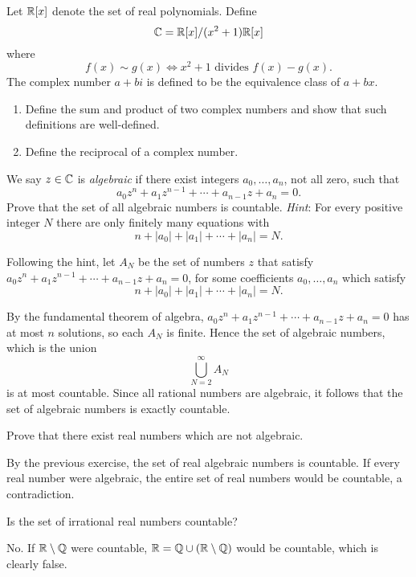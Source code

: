 \begin{exercise}
Let $\mathbb R[x]$ denote the set of real polynomials. Define
\[\mathbb C=\mathbb R[x]/(x^2+1)\mathbb R[x]\]
where
\[f(x)\sim g(x)\iff x^2+1\text{ divides }f(x)-g(x).\]
The complex number $a+bi$ is defined to be the equivalence class of $a+bx$.
\begin{enumerate}[label=(\alph*)]
\item Define the sum and product of two complex numbers and show that such definitions are well-defined.
\item Define the reciprocal of a complex number.
\end{enumerate}
\end{exercise}

\begin{exercise}
We say $z\in\mathbb C$ is \emph{algebraic} if there exist integers $a_0,\dots,a_n$, not all zero, such that
\[a_0z^n+a_1z^{n-1}+\cdots+a_{n-1}z+a_n=0.\]
Prove that the set of all algebraic numbers is countable. \emph{Hint}: For every positive integer $N$ there are only finitely many equations with
\[n+|a_0|+|a_1|+\cdots+|a_n|=N.\]
\end{exercise}

\begin{solution}
Following the hint, let $A_N$ be the set of numbers $z$ that satisfy $a_0z^n+a_1z^{n-1}+\cdots+a_{n-1}z+a_n=0$, for some coefficients $a_0,\dots,a_n$ which satisfy
\[n+|a_0|+|a_1|+\cdots+|a_n|=N.\]

By the fundamental theorem of algebra, $a_0z^n+a_1z^{n-1}+\cdots+a_{n-1}z+a_n=0$ has at most $n$ solutions, so each $A_N$ is finite. Hence the set of algebraic numbers, which is the union
\[\bigcup_{N=2}^{\infty}A_N\]
is at most countable. Since all rational numbers are algebraic, it follows that the set of algebraic numbers is exactly countable. 
\end{solution}

\begin{exercise}
Prove that there exist real numbers which are not algebraic.
\end{exercise}

\begin{solution}
By the previous exercise, the set of real algebraic numbers is countable. If every real number were algebraic, the entire set of real numbers would be countable, a contradiction.
\end{solution}

\begin{exercise}
Is the set of irrational real numbers countable?
\end{exercise}

\begin{solution}
No. If $\mathbb R\setminus\mathbb Q$ were countable, $\mathbb R=\mathbb Q\cup(\mathbb R\setminus\mathbb Q)$ would be countable, which is clearly false.
\end{solution}